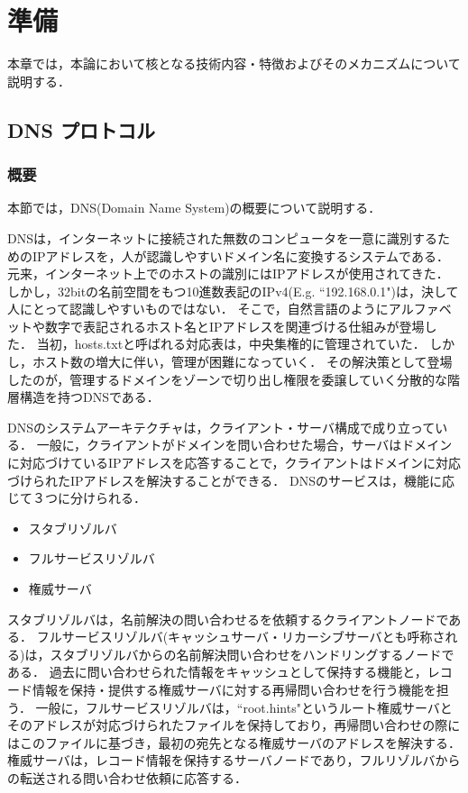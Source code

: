 \section{準備}
本章では，本論において核となる技術内容・特徴およびそのメカニズムについて説明する．
\subsection{DNS プロトコル}
\label{sec:dns-protocol}
\subsubsection{概要}
本節では，DNS(Domain Name System)の概要について説明する．

DNSは，インターネットに接続された無数のコンピュータを一意に識別するためのIPアドレスを，人が認識しやすいドメイン名に変換するシステムである．
元来，インターネット上でのホストの識別にはIPアドレスが使用されてきた．
しかし，32bitの名前空間をもつ10進数表記のIPv4(E.g. ``192.168.0.1")は，決して人にとって認識しやすいものではない．
そこで，自然言語のようにアルファベットや数字で表記されるホスト名とIPアドレスを関連づける仕組みが登場した．
当初，hosts.txtと呼ばれる対応表は，中央集権的に管理されていた．
しかし，ホスト数の増大に伴い，管理が困難になっていく．
その解決策として登場したのが，管理するドメインをゾーンで切り出し権限を委譲していく分散的な階層構造を持つDNSである．

DNSのシステムアーキテクチャは，クライアント・サーバ構成で成り立っている．
一般に，クライアントがドメインを問い合わせた場合，サーバはドメインに対応づけているIPアドレスを応答することで，クライアントはドメインに対応づけられたIPアドレスを解決することができる．
DNSのサービスは，機能に応じて３つに分けられる．
\begin{itemize}
 \item スタブリゾルバ
 \vspace{-3mm}
 \item フルサービスリゾルバ
 \vspace{-3mm}
 \item 権威サーバ
\end{itemize}

スタブリゾルバは，名前解決の問い合わせるを依頼するクライアントノードである．
フルサービスリゾルバ(キャッシュサーバ・リカーシブサーバとも呼称される)は，スタブリゾルバからの名前解決問い合わせをハンドリングするノードである．
過去に問い合わせられた情報をキャッシュとして保持する機能と，レコード情報を保持・提供する権威サーバに対する再帰問い合わせを行う機能を担う．
一般に，フルサービスリゾルバは，``root.hints"というルート権威サーバとそのアドレスが対応づけられたファイルを保持しており，再帰問い合わせの際にはこのファイルに基づき，最初の宛先となる権威サーバのアドレスを解決する．
権威サーバは，レコード情報を保持するサーバノードであり，フルリゾルバからの転送される問い合わせ依頼に応答する．

